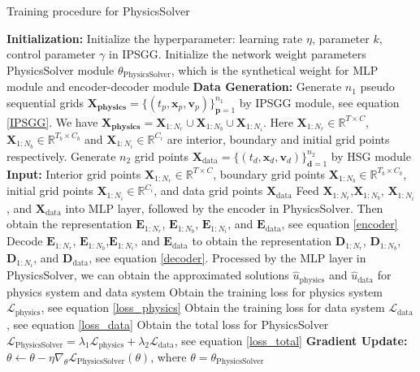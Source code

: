 \documentclass[preprint,11pt]{elsarticle}
\begin{document}
\begin{algorithm} [h]
\caption{Training procedure for PhysicsSolver}
\begin{algorithmic}[1] \label{algorithm_training}

\STATE \textbf{Initialization:} Initialize the hyperparameter: learning rate $\eta$, parameter $k$, control parameter $\gamma$ in IPSGG. Initialize the network weight parameters PhysicsSolver module $\theta_{\text{PhysicsSolver}}$, which is the synthetical weight for MLP module and encoder-decoder module
\STATE \textbf{Data Generation:} Generate $n_1$ pseudo sequential grids $\mathbf{X_{\text{physics}}}=\{(t_p,\boldsymbol{x}_p,\boldsymbol{v}_p)\}_{\boldsymbol{p}=1}^{n_1}$ by IPSGG module, see equation \eqref{IPSGG}. We have $\mathbf{X_{\text{physics}}}= \mathbf{X}_{1:N_r} \cup \mathbf{X}_{1:N_b} \cup \mathbf{X}_{1:N_i}$. Here  $\mathbf{X}_{1:N_r} \in \mathbb{R}^{T \times C}$, $\mathbf{X}_{1:N_b} \in \mathbb{R}^{T_b \times C_b}$ and $\mathbf{X}_{1:N_i} \in \mathbb{R}^{C_i}$ are interior, boundary and initial grid points respectively. Generate $n_2$ grid points $\mathbf{X}_{\text{data}} = \{(t_d,\boldsymbol{x}_d,\boldsymbol{v}_d)\}_{\boldsymbol{d}=1}^{n_2}$ by HSG module
\STATE \textbf{Input:} Interior grid points $\mathbf{X}_{1:N_r} \in \mathbb{R}^{T \times C}$, boundary grid points $\mathbf{X}_{1:N_b} \in \mathbb{R}^{T_b \times C_b}$, initial grid points $\mathbf{X}_{1:N_i} \in \mathbb{R}^{C_i}$, and data grid points $\mathbf{X}_{\text{data}}$
\STATE Feed $\mathbf{X}_{1:N_r}$,$\mathbf{X}_{1:N_b}$, $\mathbf{X}_{1:N_i}$, and  $\mathbf{X}_{\text{data}}$ into MLP layer, followed by the encoder in PhysicsSolver. Then obtain the representation $\mathbf{E}_{1:N_r}$, $\mathbf{E}_{1:N_b}$, $\mathbf{E}_{1:N_i}$, and $\mathbf{E}_{\text{data}}$, see equation \eqref{encoder}
\STATE Decode $\mathbf{E}_{1:N_r}$, $\mathbf{E}_{1:N_b}$,$\mathbf{E}_{1:N_i}$, and $\mathbf{E}_{\text{data}}$ to obtain the representation $\mathbf{D}_{1:N_r}$, $\mathbf{D}_{1:N_b}$,$\mathbf{D}_{1:N_i}$, and $\mathbf{D}_{\text{data}}$, see equation \eqref{decoder}. Processed by the MLP layer in PhysicsSolver, we can obtain the approximated solutions $\hat{u}_{\text{physics}}$ and $\hat{u}_{\text{data}}$ for physics system and data system
\STATE Obtain the training loss for physics system $\mathcal{L}_{\text{physics}}$, see equation \eqref{loss_physics}
\STATE Obtain the training loss for data system $\mathcal{L}_{\text{data}}$, see equation \eqref{loss_data}
\STATE Obtain the total loss for PhysicsSolver $\mathcal{L}_{\text{PhysicsSolver}} = \lambda_1\mathcal{L}_\text{physics} 
 + \lambda_2\mathcal{L}_{\text{data}}$, see equation  \eqref{loss_total}
\STATE \textbf{Gradient Update:} $\theta \gets \theta - \eta \nabla_{\theta} \mathcal{L}_{\text{PhysicsSolver}}(\theta)$, where $\theta =  \theta_{\text{PhysicsSolver}}$
\ENDFOR
\end{algorithmic}
\end{algorithm}
\end{document}
